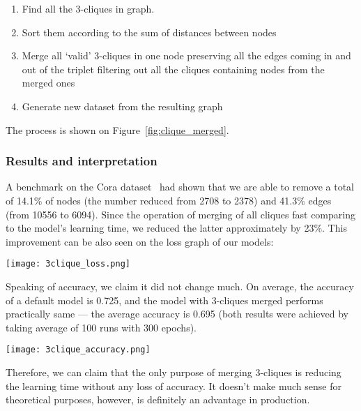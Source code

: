 \begin{enumerate}
    \item Find all the 3-cliques in graph.
    \item Sort them according to the sum of distances between nodes
    \item Merge all `valid' 3-cliques in one node preserving all the edges coming in and out of the triplet filtering out all the cliques containing nodes from the merged ones
    \item Generate new dataset from the resulting graph
\end{enumerate}

The process is shown on Figure~\ref{fig:clique_merged}.

\subsubsection*{Results and interpretation}

A benchmark on the Cora dataset~\cite{cora_dataset} had shown that we are able to remove a total of 14.1\% of nodes (the number reduced from 2708 to 2378) and 41.3\% edges (from 10556 to 6094).
Since the operation of merging of all cliques fast comparing to the model's learning time, we reduced the latter approximately by 23\%.
This improvement can be also seen on the loss graph of our models:

\texttt{[image: 3clique\_loss.png]}

Speaking of accuracy, we claim it did not change much.
On average, the accuracy of a default model is 0.725, and the model with 3-cliques merged performs practically same --- the average accuracy is 0.695 (both results were achieved by taking average of 100 runs with 300 epochs).

\texttt{[image: 3clique\_accuracy.png]}

Therefore, we can claim that the only purpose of merging 3-cliques is reducing the learning time without any loss of accuracy.
It doesn't make much sense for theoretical purposes, however, is definitely an advantage in production.




